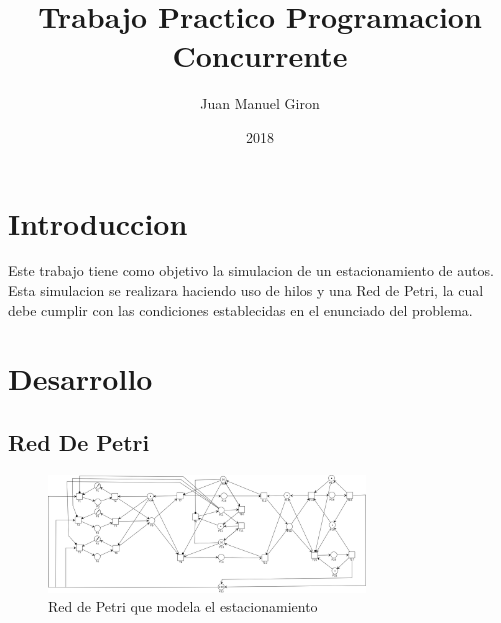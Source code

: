 \documentclass{article}
\title{Trabajo Practico Programacion Concurrente}
\author{Juan Manuel Giron}
\date{2018}
\begin{document}
\maketitle

\section{Introduccion}
Este trabajo tiene como objetivo la simulacion de un estacionamiento de autos. 
Esta simulacion se realizara haciendo uso de hilos y una Red de Petri, la cual 
debe cumplir con las condiciones establecidas en el enunciado del problema.
\section{Desarrollo}
	\subsection{Red De Petri}
	\begin{figure}[H]
		\centering
		\includegraphics[width=0.75\textwidth]{RedDePetri}
		\caption{Red de Petri que modela el estacionamiento}
		\label{fig:mesh1}
	\end{figure}
\end{document}
